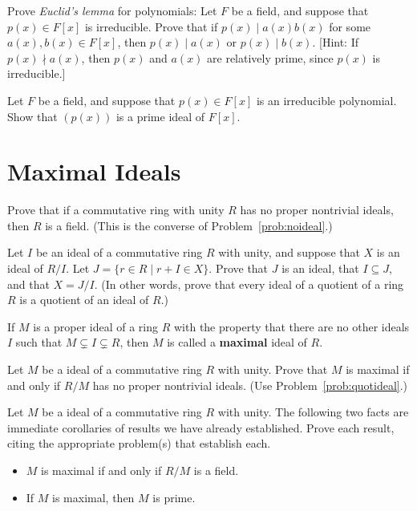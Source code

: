 \begin{problem}
Prove \emph{Euclid's lemma} for polynomials: Let \(F\) be a field, and suppose that \(p(x)\in F[x]\) is irreducible. Prove that if \(p(x) \mid a(x)b(x)\) for some \(a(x),b(x)\in F[x]\), then \(p(x) \mid a(x)\) or \(p(x) \mid b(x)\). [Hint: If \(p(x) \nmid a(x)\), then \(p(x)\) and \(a(x)\) are relatively prime, since \(p(x)\) is irreducible.]
\end{problem}

\begin{problem}
Let \(F\) be a field, and suppose that \(p(x) \in F[x]\) is an irreducible polynomial. Show that \((p(x))\) is a prime ideal of \(F[x]\).
\end{problem}

\section{Maximal Ideals}
\begin{problem}
Prove that if a commutative ring with unity \(R\) has no proper nontrivial ideals, then \(R\) is a field. (This is the converse of Problem~\ref{prob:noideal}.)
\end{problem}

\begin{problem}\label{prob:quotideal}
Let \(I\) be an ideal of a commutative ring \(R\) with unity, and suppose that \(X\) is an ideal of \(R/I\). Let \(J = \{r \in R \mid r+I \in X\}\). Prove that \(J\) is an ideal, that \(I \subseteq J\), and that \(X = J/I\). (In other words, prove that every ideal of a quotient of a ring \(R\) is a quotient of an ideal of \(R\).)
\end{problem}

\begin{definition}
If \(M\) is a proper ideal of a ring \(R\) with the property that there are no other ideals \(I\) such that \(M \subsetneq I \subsetneq R\), then \(M\) is called a \textbf{maximal} ideal of \(R\).
\end{definition}

\begin{problem}
Let \(M\) be a ideal of a commutative ring \(R\) with unity. Prove that \(M\) is maximal if and only if \(R/M\) has no proper nontrivial ideals. (Use Problem~\ref{prob:quotideal}.)
\end{problem}

\begin{problem}
Let \(M\) be a ideal of a commutative ring \(R\) with unity. The following two facts are immediate corollaries of results we have already established. Prove each result, citing the appropriate problem(s) that establish each.
\begin{itemize}
  \item \(M\) is maximal if and only if \(R/M\) is a field.
  \item If \(M\) is maximal, then \(M\) is prime.
\end{itemize}
\end{problem}

